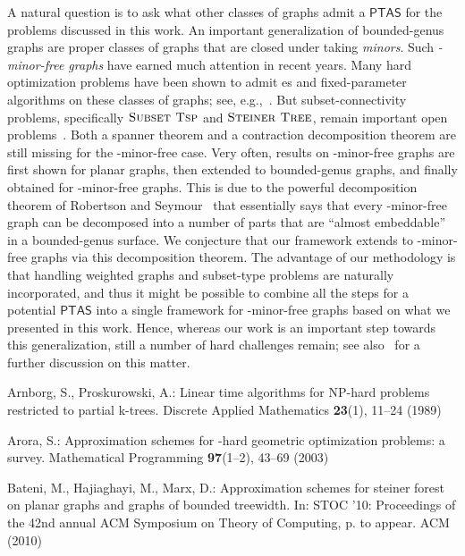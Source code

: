 \documentclass{article}
\newcommand{\CompClass}[1]{\ensuremath{\mathsf{#1}}\xspace}
\newcommand{\PTAS}{\CompClass{PTAS}}
\newcommand{\myproblemname}[1]{\ensuremath{\mbox{\sc #1}}\xspace}
\newcommand{\steiner}{\myproblemname{Steiner Tree}}
\newcommand{\subtsp}{\myproblemname{Subset Tsp}}
\begin{document}
\begin{center}
{\begin{minipage}[h]{0.95\linewidth}
A natural question is to ask what other classes of graphs admit a
\PTAS for the problems discussed in this work. An important
generalization of bounded-genus graphs are proper classes of graphs
that are closed under taking \emph{minors}. Such \emph{-minor-free
  graphs} have earned much attention in recent years. Many hard
optimization problems have been shown to admit es and
fixed-parameter algorithms on these classes of graphs; see,
e.g.,~\cite{DemaineHajiaghayi05-PTAS,Grohe03}. But subset-connectivity
problems, specifically \subtsp and \steiner, remain important open
problems~\cite{Grohe03,DemaineHM07}. Both a spanner theorem and a
contraction decomposition theorem are still missing for the
-minor-free case. Very often, results on -minor-free graphs are
first shown for planar graphs, then extended to bounded-genus graphs,
and finally obtained for -minor-free graphs. This is due to the
powerful decomposition theorem of Robertson and
Seymour~\cite{GraphMinors16} that essentially says that every
-minor-free graph can be decomposed into a number of parts that are
``almost embeddable'' in a bounded-genus surface. We conjecture that
our framework extends to -minor-free graphs via this decomposition
theorem. The advantage of our methodology is that handling weighted
graphs and subset-type problems are naturally incorporated,
and thus it might be possible to combine all the steps for a
potential \PTAS into a single framework for -minor-free graphs
based on what we presented in this work.  Hence, whereas our
work is an important step towards this generalization, still a number
of hard challenges remain; see also~\cite{DemaineHM07} for a further
discussion on this matter.






\begin{thebibliography}{10}


Arnborg, S., Proskurowski, A.: Linear time algorithms for {NP}-hard problems
  restricted to partial k-trees.
\newblock Discrete Applied Mathematics \textbf{23}(1), 11--24 (1989)

Arora, S.: Approximation schemes for {}-hard geometric optimization
  problems: a survey.
\newblock Mathematical Programming \textbf{97}(1--2), 43--69 (2003)

Bateni, M., Hajiaghayi, M., Marx, D.: Approximation schemes for steiner forest
  on planar graphs and graphs of bounded treewidth.
\newblock In: STOC '10: Proceedings of the 42nd annual ACM Symposium on Theory
  of Computing, p. to appear. ACM (2010)


\end{thebibliography}
\end{minipage}}
\end{center}
\end{document}
